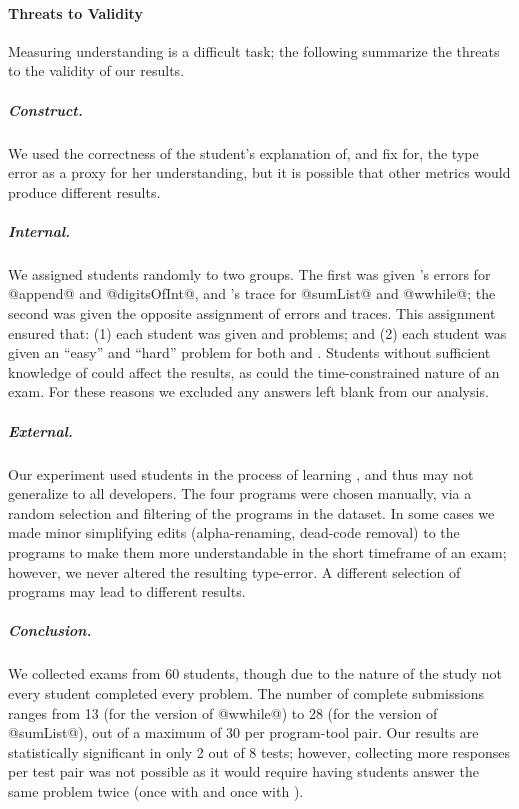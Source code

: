 \paragraph{Threats to Validity}
Measuring understanding is a difficult task; the following summarize
the threats to the validity of our results.

\subparagraph{Construct.}
%
We used the correctness of the student's explanation of, and fix for,
the type error as a proxy for her understanding, but it is possible
that other metrics would produce different results.

\subparagraph{Internal.}
%
We assigned students randomly to two groups. The first was given
\ocaml's errors for @append@ and \hbox{@digitsOfInt@,} and \toolname's trace
for @sumList@ and \hbox{@wwhile@;} the second was given the opposite
assignment of errors and traces. This assignment ensured that: (1) each
student was given \ocaml and \toolname problems; and (2) each student
was given an ``easy'' and ``hard'' problem for both \ocaml and
\toolname. Students without sufficient knowledge of \ocaml could affect
the results, as could the time-constrained nature of an exam. For these
reasons we excluded any answers left blank from our analysis.

\subparagraph{External.}
%
Our experiment used students in the process of learning \ocaml,
and thus may not generalize to all developers. The four
programs were chosen manually, via a random selection and
filtering of the programs in the \ucsdbench dataset. In some cases we made
minor simplifying edits (\eg alpha-renaming, dead-code removal) to the
programs to make them more understandable in the short timeframe of an
exam; however, we never altered the resulting type-error. A different
selection of programs may lead to different results.

\subparagraph{Conclusion.}
%
We collected exams from 60 students, though due to the nature of the
study not every student completed every problem.
%
The number of complete submissions ranges from 13 (for the \toolname
version of @wwhile@) to 28 (for the \ocaml version of @sumList@), out of
a maximum of 30 per program-tool pair.
%
Our results are statistically significant in only 2 out of 8 tests; however,
collecting more responses per test pair was not possible as it
would require having students answer the same problem twice (once with
\ocaml and once with \toolname).

